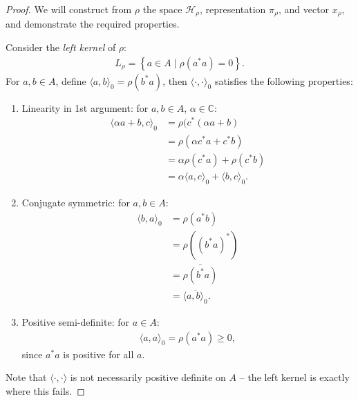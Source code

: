 \documentclass[11pt,a4paper]{report}
\theoremstyle{plain}
\theoremstyle{definition}
\newcommand{\1}{\mathbbm{1}}
\newcommand{\Hr}{\mathcal{H}_\rho}
\begin{document}
\begin{proof}
	We will construct from $\rho$ the space $\Hr$, representation $\pi_\rho$, and 
	vector $x_\rho$, and demonstrate the required properties.
	
	Consider the \emph{left kernel} of $\rho$:
	\begin{align*}
		L_\rho = \left\{a \in A \mid \rho (a ^\ast a) = 0 \right\}.
	\end{align*}	
	For $a,b \in A$, define $\langle a , b \rangle_0 = \rho(b^\ast a)$, then 
	$\langle \cdot, \cdot \rangle_0$ satisfies the following properties:
	\begin{enumerate}
	  \item Linearity in 1st argument: for $a,b\in A$, $\alpha \in \mathbb{C}$:
		\begin{align*}
		   \langle \alpha a +  b, c \rangle_0 
		&= \rho (c^\ast(\alpha a +  b)   											\\
		&= \rho (\alpha c^\ast a +  c^\ast b)  									\\
		&= \alpha \rho (c^\ast a) +  \rho (c^\ast b)								\\
		&= \alpha \langle a , c \rangle_0 +  \langle b, c \rangle_0.
		\end{align*}
	  \item Conjugate symmetric: for $a,b \in A$:
	  	\begin{align*}
	  	   \langle b,a \rangle _0 
	  	&= \rho (a^\ast b)																\\
	  	&= \rho ((b^\ast a)^\ast)														\\
	  	&= \overline{\rho (b^\ast a)}													\\
	  	&= \overline{\langle a,b \rangle _0 }.
	  	\end{align*}
	  \item Positive semi-definite: for $a \in A$:
	  	\begin{align*}
	  		\langle a,a\rangle_0 = \rho(a^\ast a) \geq 0,
	  	\end{align*}
	  	since $a^\ast a$ is positive for all $a$.
	\end{enumerate}
	Note that $\langle \cdot, \cdot \rangle$ is not necessarily positive definite on 
	$A$ -- the left kernel is exactly where this fails.
	

\end{proof}
\end{document}
